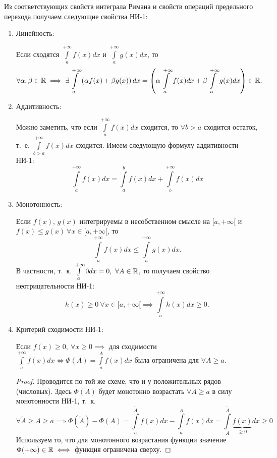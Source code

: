 \documentclass[../../main.tex]{subfiles}
\begin{document}
Из соответствующих свойств интеграла Римана и свойств операций предельного
перехода получаем следующие свойства НИ-1:
\begin{enumerate}
        \item Линейность:
        
        Если сходятся $\displaystyle\int\limits_a^{+\infty} f(x)dx$ и
        $\displaystyle\int\limits_a^{+\infty} g(x)dx$, то \[\forall \alpha, \beta \in \mathbb{R}
        \implies  \exists \int\limits_a^{+\infty} \left( \alpha f(x)
        + \beta g(x) \right)dx = \left( \alpha \int\limits_a^{+\infty}
        f(x)dx + \beta \int\limits_a^{+\infty} g(x)dx \right) \in \mathbb{R}.\]
        \item Аддитивность:
        
        Можно заметить, что если $\displaystyle\int\limits_a^{+\infty} f(x)dx$ сходится, то
        $\forall b>a$ сходится остаток, т.~е.
        $\displaystyle\int\limits_{b>a}^{+\infty} f(x)dx$ сходится. Имеем следующую формулу
        аддитивности НИ-1:
        \[\int\limits_a^{+\infty} f(x)dx = \int\limits_a^b f(x)dx +
        \int\limits_b^{+\infty} f(x)dx \]
        \item Монотонность:
        
        Если $f(x)$, $g(x)$ интегрируемы в несобственном смысле на
        $[a, +\infty[$
        и $f(x) \leq g(x) \ {\forall x \in [a, +\infty[}$, то
        \[\int\limits_a^{+\infty} f(x)dx \leq \int\limits_a^{+\infty} g(x)dx.\]
        В частности, т.~к. $\int\limits_a^{+\infty} 0dx = 0, \ \forall A \in \mathbb{R}$, то получаем свойство неотрицательности НИ-1: \[h(x) \geq 0 \ 
        \forall x \in
        [a, +\infty[ \implies \int\limits_a^{+\infty} h(x)dx \geq 0.\]
        \item Критерий сходимости НИ-1:
        
        Если $f(x) \geq 0, \ \forall x \geq 0 \implies$ для сходимости
        $ \int\limits_a^{+\infty} f(x)dx \iff \Phi(A) =
        \int\limits_a^{A} f(x)dx$ была ограничена для $\forall A \geq a$.
        \begin{proof}
            Проводится по той же схеме, что и у положительных рядов (числовых).
            Здесь $\Phi(A)$ будет монотонно возрастать $\forall A \geq a$
            в силу монотонности НИ-1, т.~к.
            \[\forall \tilde{A} \geq A \geq a
            \implies \Phi(\tilde{A}) - \Phi(A) =
            \int\limits_a^{\tilde{A}} f(x)dx - \int\limits_a^{A} f(x)dx =
            \int\limits_A^{\tilde{A}} \underbrace{f(x)}_{\geq 0} dx \geq 0 \]
            Используем то, что для монотонного возрастания функции значение
            $\Phi (+\infty) \in \mathbb{R} \iff$ функция ограничена сверху.
        \end{proof}
\end{enumerate}
\end{document}
